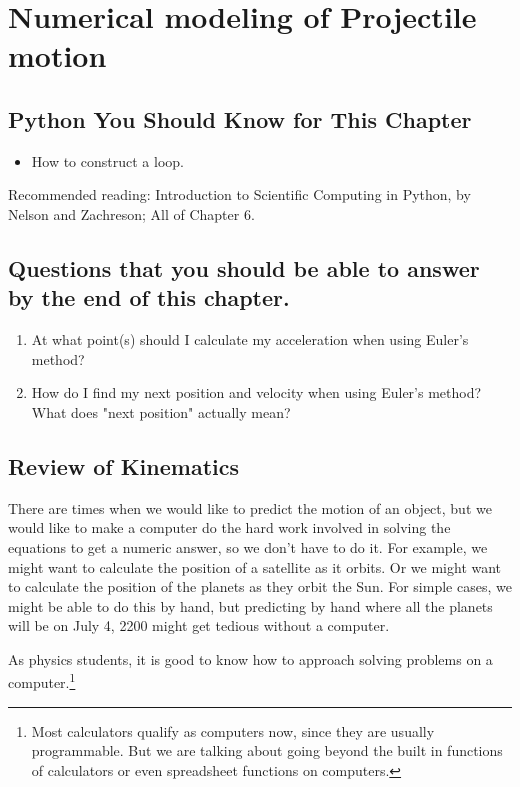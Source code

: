 \documentclass[twoside,11pt,ShortChapTitles]{BYUTextbook}
\begin{document}
\chapter[Numerical modeling I]{Numerical modeling of Projectile motion}
\setcounter{page}{1}
\section*{Python You Should Know for This Chapter}
\begin{itemize}
\item How to construct a  loop.
\end{itemize}
Recommended reading: Introduction to Scientific Computing in Python, by Nelson and Zachreson; All of Chapter 6.
\section*{Questions that you should be able to answer by the end of this chapter.}
\begin{enumerate}
\item At what point(s) should I calculate my acceleration when using Euler's method?
\item How do I find my next position and velocity when using Euler's method? What does "next position" actually mean?
\end{enumerate}
\hrulefill


\section{Review of Kinematics}

There are times when we would like to predict the motion of an object, but we
would like to make a computer do the hard work involved in solving the
equations to get a numeric answer, so we don't have to do it. For example, we
might want to calculate the position of a satellite as it orbits. Or we might
want to calculate the position of the planets as they orbit the Sun. For
simple cases, we might be able to do this by hand, but predicting by hand
where all the planets will be on July 4, 2200 might get tedious without a computer.

As physics students, it is good to know how to approach solving problems on a
computer.\footnote{Most calculators qualify as computers now, since they are
usually programmable. But we are talking about going beyond the built in
functions of calculators or even spreadsheet functions on computers.}
\end{document}
